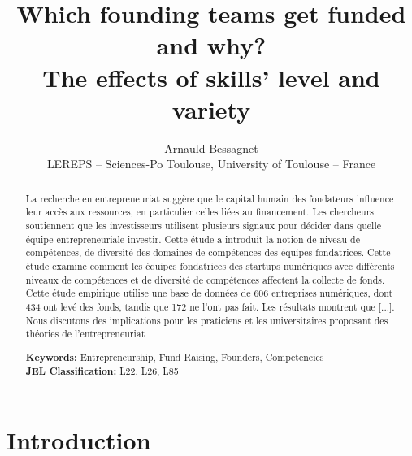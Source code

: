 \documentclass[12pt]{article}
\begin{document}
\title{Which founding teams get funded and why? \\ The effects of skills' level and variety}

\author{Arnauld Bessagnet \\ \footnotesize{LEREPS – Sciences-Po Toulouse, University of Toulouse – France} \\}

\maketitle \vspace{-1,5em}

\begin{abstract}
\noindent
La recherche en entrepreneuriat suggère que le capital humain des fondateurs influence leur accès aux ressources, en particulier celles liées au financement. Les chercheurs soutiennent que les investisseurs utilisent plusieurs signaux pour décider dans quelle équipe entrepreneuriale investir. Cette étude a introduit la notion de niveau de compétences, de diversité des domaines de compétences des équipes fondatrices. Cette étude examine comment les équipes fondatrices des startups numériques avec différents niveaux de compétences et de diversité de compétences affectent la collecte de fonds. Cette étude empirique utilise une base de données de 606 entreprises numériques, dont 434 ont levé des fonds, tandis que 172 ne l'ont pas fait. Les résultats montrent que [...]. Nous discutons des implications pour les praticiens et les universitaires proposant des théories de l'entrepreneuriat \newline

\begin{obeylines}
\noindent \footnotesize{}{\textbf{Keywords:} Entrepreneurship, Fund Raising, Founders, Competencies}
\noindent \footnotesize{\textbf{JEL Classification:} L22, L26, L85}
\end{obeylines}

\end{abstract}

\clearpage
\section{Introduction}
\end{document}
